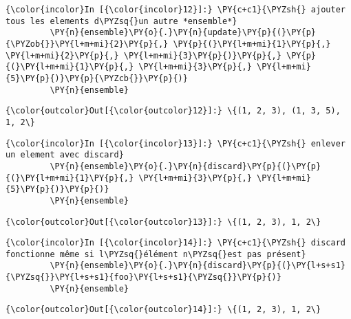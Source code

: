     \begin{Verbatim}[commandchars=\\\{\},frame=single,framerule=0.3mm,rulecolor=\color{cellframecolor}]
{\color{incolor}In [{\color{incolor}12}]:} \PY{c+c1}{\PYZsh{} ajouter tous les elements d\PYZsq{}un autre *ensemble*}
         \PY{n}{ensemble}\PY{o}{.}\PY{n}{update}\PY{p}{(}\PY{p}{\PYZob{}}\PY{l+m+mi}{2}\PY{p}{,} \PY{p}{(}\PY{l+m+mi}{1}\PY{p}{,} \PY{l+m+mi}{2}\PY{p}{,} \PY{l+m+mi}{3}\PY{p}{)}\PY{p}{,} \PY{p}{(}\PY{l+m+mi}{1}\PY{p}{,} \PY{l+m+mi}{3}\PY{p}{,} \PY{l+m+mi}{5}\PY{p}{)}\PY{p}{\PYZcb{}}\PY{p}{)}
         \PY{n}{ensemble}
\end{Verbatim}


\begin{Verbatim}[commandchars=\\\{\},frame=single,framerule=0.3mm,rulecolor=\color{cellframecolor}]
{\color{outcolor}Out[{\color{outcolor}12}]:} \{(1, 2, 3), (1, 3, 5), 1, 2\}
\end{Verbatim}
            
    \begin{Verbatim}[commandchars=\\\{\},frame=single,framerule=0.3mm,rulecolor=\color{cellframecolor}]
{\color{incolor}In [{\color{incolor}13}]:} \PY{c+c1}{\PYZsh{} enlever un element avec discard}
         \PY{n}{ensemble}\PY{o}{.}\PY{n}{discard}\PY{p}{(}\PY{p}{(}\PY{l+m+mi}{1}\PY{p}{,} \PY{l+m+mi}{3}\PY{p}{,} \PY{l+m+mi}{5}\PY{p}{)}\PY{p}{)}
         \PY{n}{ensemble}
\end{Verbatim}


\begin{Verbatim}[commandchars=\\\{\},frame=single,framerule=0.3mm,rulecolor=\color{cellframecolor}]
{\color{outcolor}Out[{\color{outcolor}13}]:} \{(1, 2, 3), 1, 2\}
\end{Verbatim}
            
    \begin{Verbatim}[commandchars=\\\{\},frame=single,framerule=0.3mm,rulecolor=\color{cellframecolor}]
{\color{incolor}In [{\color{incolor}14}]:} \PY{c+c1}{\PYZsh{} discard fonctionne même si l\PYZsq{}élément n\PYZsq{}est pas présent}
         \PY{n}{ensemble}\PY{o}{.}\PY{n}{discard}\PY{p}{(}\PY{l+s+s1}{\PYZsq{}}\PY{l+s+s1}{foo}\PY{l+s+s1}{\PYZsq{}}\PY{p}{)}
         \PY{n}{ensemble}
\end{Verbatim}


\begin{Verbatim}[commandchars=\\\{\},frame=single,framerule=0.3mm,rulecolor=\color{cellframecolor}]
{\color{outcolor}Out[{\color{outcolor}14}]:} \{(1, 2, 3), 1, 2\}
\end{Verbatim}
            
